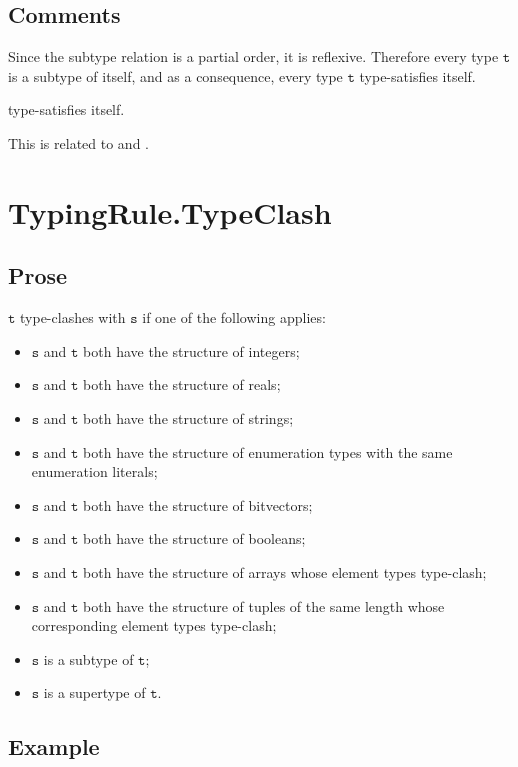 \documentclass{book}
\newcommand\vt[0]{\texttt{t}}
\newcommand\vs[0]{\texttt{s}}
\begin{document}
\subsection{Comments}
  Since the subtype relation is a partial order, it is reflexive. Therefore
  every type $\vt$ is a subtype of itself, and as a consequence, every type $\vt$
  type-satisfies itself.

  type-satisfies itself.

  This is related to  and .


\section{TypingRule.TypeClash\label{sec:TypingRule.TypeClash}}

  \subsection{Prose}
  $\vt$ type-clashes with $\vs$ if one of the following applies:
  \begin{itemize}
  \item $\vs$ and $\vt$ both have the structure of integers;
  \item $\vs$ and $\vt$ both have the structure of reals;
  \item $\vs$ and $\vt$ both have the structure of strings;
  \item $\vs$ and $\vt$ both have the structure of enumeration types with the same enumeration literals;
  \item $\vs$ and $\vt$ both have the structure of bitvectors;
  \item $\vs$ and $\vt$ both have the structure of booleans;
  \item $\vs$ and $\vt$ both have the structure of arrays whose element types type-clash;
  \item $\vs$ and $\vt$ both have the structure of tuples of the same length whose
    corresponding element types type-clash;
  \item $\vs$ is a subtype of $\vt$;
  \item $\vs$ is a supertype of $\vt$.
  \end{itemize}

  \subsection{Example}


\end{document}
